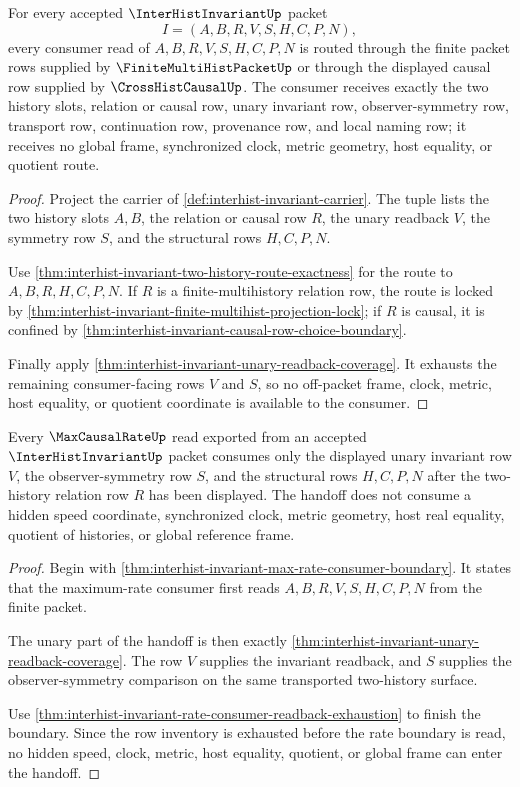 \begin{theorem}
\label{thm:interhist-invariant-consumer-row-exactness}
For every accepted $\InterHistInvariantUp$ packet
$$
I=(A,B,R,V,S,H,C,P,N),
$$
every consumer read of $A,B,R,V,S,H,C,P,N$ is routed through the finite packet rows supplied by $\FiniteMultiHistPacketUp$ or through the displayed causal row supplied by $\CrossHistCausalUp$. The consumer receives exactly the two history slots, relation or causal row, unary invariant row, observer-symmetry row, transport row, continuation row, provenance row, and local naming row; it receives no global frame, synchronized clock, metric geometry, host equality, or quotient route.
\end{theorem}
\begin{proof}
Project the carrier of \autoref{def:interhist-invariant-carrier}. The tuple lists the two history slots $A,B$, the relation or causal row $R$, the unary readback $V$, the symmetry row $S$, and the structural rows $H,C,P,N$.

Use \autoref{thm:interhist-invariant-two-history-route-exactness} for the route to $A,B,R,H,C,P,N$. If $R$ is a finite-multihistory relation row, the route is locked by \autoref{thm:interhist-invariant-finite-multihist-projection-lock}; if $R$ is causal, it is confined by \autoref{thm:interhist-invariant-causal-row-choice-boundary}.

Finally apply \autoref{thm:interhist-invariant-unary-readback-coverage}. It exhausts the remaining consumer-facing rows $V$ and $S$, so no off-packet frame, clock, metric, host equality, or quotient coordinate is available to the consumer.
\end{proof}

\begin{theorem}
\label{thm:interhist-invariant-rate-handoff-exactness}
Every $\MaxCausalRateUp$ read exported from an accepted $\InterHistInvariantUp$ packet consumes only the displayed unary invariant row $V$, the observer-symmetry row $S$, and the structural rows $H,C,P,N$ after the two-history relation row $R$ has been displayed. The handoff does not consume a hidden speed coordinate, synchronized clock, metric geometry, host real equality, quotient of histories, or global reference frame.
\end{theorem}
\begin{proof}
Begin with \autoref{thm:interhist-invariant-max-rate-consumer-boundary}. It states that the maximum-rate consumer first reads $A,B,R,V,S,H,C,P,N$ from the finite packet.

The unary part of the handoff is then exactly \autoref{thm:interhist-invariant-unary-readback-coverage}. The row $V$ supplies the invariant readback, and $S$ supplies the observer-symmetry comparison on the same transported two-history surface.

Use \autoref{thm:interhist-invariant-rate-consumer-readback-exhaustion} to finish the boundary. Since the row inventory is exhausted before the rate boundary is read, no hidden speed, clock, metric, host equality, quotient, or global frame can enter the handoff.
\end{proof}

